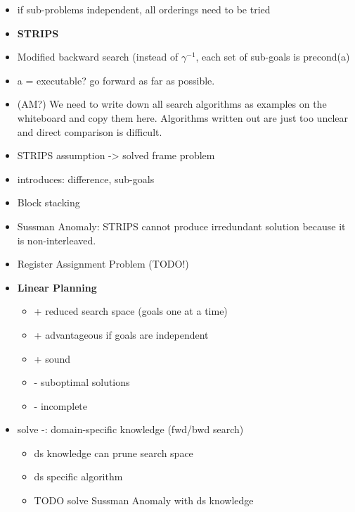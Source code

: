 \begin{itemize}
\item if sub-problems independent, all orderings need to be tried

\item \textbf{STRIPS}
\item Modified backward search (instead of $\gamma^{-1}$, each set of sub-goals is precond(a)
\item a = executable? go forward as far as possible.
\item (AM?) We need to write down all search algorithms as examples on the whiteboard and copy them here. Algorithms written out are just too unclear and direct comparison is difficult.
\item STRIPS assumption -> solved frame problem
\item introduces: difference, sub-goals

\item Block stacking
\item Sussman Anomaly: STRIPS cannot produce irredundant solution because it is non-interleaved.
\item Register Assignment Problem (TODO!)

\item \textbf{Linear Planning}
	\begin{itemize}
	\item + reduced search space (goals one at a time)
	\item + advantageous if goals are independent
	\item + sound
	\item - suboptimal solutions
	\item - incomplete
	\end{itemize}

\item solve -: domain-specific knowledge (fwd/bwd search)
	\begin{itemize}
	\item ds knowledge can prune search space
	\item ds specific algorithm
	\item TODO solve Sussman Anomaly with ds knowledge
	\end{itemize}


\end{itemize}